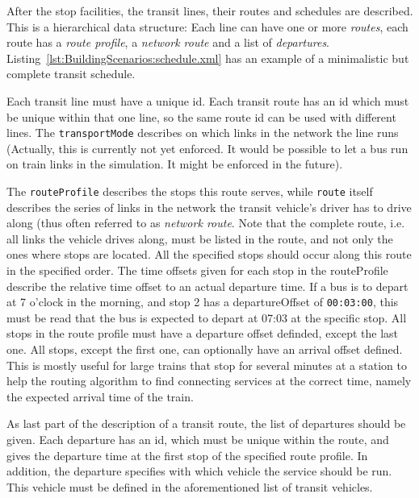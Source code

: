 After the stop facilities, the transit lines, their routes and schedules
are described. This is a hierarchical data structure: Each line can have one or
more \emph{routes}, each route has a \emph{route profile}, a \emph{network
route} and a list of \emph{departures}.
Listing~\ref{lst:BuildingScenarios:schedule.xml} has an example of a
minimalistic but complete transit schedule.

Each transit line must have a unique id. Each transit route has an id which must
be unique within that one line, so the same route id can be used with different
lines. The {\tt transportMode} describes on which links in the network the line
runs (Actually, this is currently not yet enforced. It would be possible to let
a bus run on train links in the simulation. It might be enforced in the future).

The {\tt routeProfile} describes the stops this route serves, while {\tt route}
itself describes the series of links in the network the transit vehicle's driver
has to drive along (thus often referred to as \emph{network route}. Note that
the complete route, i.e. all links the vehicle drives along, must be listed in
the route, and not only the ones where stops are located. All the specified
stops should occur along this route in the specified order. The time offsets
given for each stop in the routeProfile describe the relative time offset to an
actual departure time. If a bus is to depart at 7 o'clock in the morning, and
stop 2 has a departureOffset of {\tt 00:03:00}, this must be read that the bus
is expected to depart at 07:03 at the specific stop. All stops in the route
profile must have a departure offset definded, except the last one. All stops,
except the first one, can optionally have an arrival offset defined. This is
mostly useful for large trains that stop for several minutes at a station to
help the routing algorithm to find connecting services at the correct time,
namely the expected arrival time of the train.

As last part of the description of a transit
route, the list of departures should be given. Each departure has an id, which must be unique within the
route, and gives the departure time at the first stop of the specified
route profile. In addition, the departure specifies with which vehicle the
service should be run. This vehicle must be defined in the aforementioned
list of transit vehicles.

